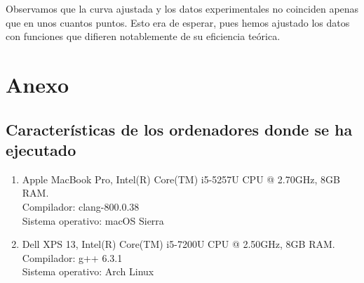 \documentclass[11pt]{article}
\begin{document}
	\begin{center}
		
	\end{center}

	\fontsize{10pt}{7.2}\selectfont
	\begin{center}
		
	\end{center}

\fontsize{11pt}{7.2}\selectfont
Observamos que la curva ajustada y los datos experimentales no coinciden apenas que en unos cuantos puntos. Esto era de esperar, pues hemos ajustado los datos con funciones que difieren notablemente de su eficiencia teórica.

\newpage

\section*{Anexo}
\subsection*{Características de los ordenadores donde se ha ejecutado}

\vspace{0.5em}

\begin{enumerate}
\item Apple MacBook Pro, Intel(R) Core(TM) i5-5257U CPU @ 2.70GHz, 8GB RAM.\\  Compilador: clang-800.0.38 \\
Sistema operativo: macOS Sierra
\item Dell XPS 13, Intel(R) Core(TM) i5-7200U CPU @ 2.50GHz, 8GB RAM.\\
Compilador: g++ 6.3.1\\
Sistema operativo: Arch Linux
\end{enumerate}
\end{document}
